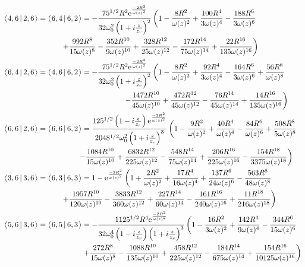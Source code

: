 \documentclass[11pt]{amsart}
\makeatletter
\newcommand{\e}{{\rm e}}				%
\newcommand{\msp}[1]{\mspace{#1mu}}		%
\newcommand{\0}{\varnothing}		%
\newcommand{\brac}[2]{\left\langle\msp{2} #1\left\lvert \msp{3.5} #2 \right.\right\rangle}	%
\newcommand{\1}{!}
\newcommand{\2}{@}
\newcommand{\3}{\#}
\newcommand{\4}{\$}
\newcommand{\5}{\%}
\newcommand{\6}{$^\wedge$}
\newcommand{\7}{\&}
\newcommand{\8}{*}
\newcommand{\9}{(}
\makeatother
\begin{document}
\begin{align*}
&\brac{4,6}{2,6} =\brac{6,4}{6,2} = -\frac{75^{1/2}R^2\e^{\frac{-2R^2}{\omega(z)^2}}}{32\omega_0^2\left(1+i\frac{z}{z_r}\right)^2}\left(1-\frac{8R^2}{\omega(z)^2}+\frac{100R^4}{3\omega(z)^4}-\frac{188R^6}{3\omega(z)^6}\right.
\\
&
\msp{140}\left.+\frac{992R^8}{15\omega(z)^8}-\frac{352R^{10}}{9\omega(z)^{10}}+\frac{328R^{12}}{25\omega(z)^{12}}-\frac{172R^{14}}{75\omega(z)^{14}}+\frac{22R^{16}}{135\omega(z)^{16}}\right)
\\
&
\brac{6,4}{2,6} = \brac{4,6}{6,2}=-\frac{75^{1/2}R^2\e^{\frac{-2R^2}{\omega(z)^2}}}{32\omega_0^2\left(1+i\frac{z}{z_r}\right)^2}\left(1-\frac{8R^2}{\omega(z)^2}+\frac{92R^4}{3\omega(z)^4}-\frac{164R^6}{3\omega(z)^6}+\frac{56R^8}{\omega(z)^8}\right.
\\
&
\msp{290}\left.-\frac{1472R^{10}}{45\omega(z)^{10}}+\frac{472R^{12}}{45\omega(z)^{12}}-\frac{76R^{14}}{45\omega(z)^{14}}+\frac{14R^{16}}{135\omega(z)^{16}}\right)
\\
&
\brac{6,6}{2,6} = \brac{6,6}{6,2} = \frac{125^{1/2}\left(1-i\frac{z}{z_r}\right)\e^{\frac{-2R^2}{\omega(z)^2}}}{2048^{1/2}\omega_0^2\left(1+i\frac{z}{z_r}\right)^3}\left(1-\frac{9R^2}{\omega(z)^2}+\frac{40R^4}{\omega(z)^4}-\frac{84R^6}{\omega(z)^6}+\frac{508R^8}{5\omega(z)^8}\right.
\\
&
\msp{180}\left.-\frac{1084R^{10}}{15\omega(z)^{10}}+\frac{6832R^{12}}{225\omega(z)^{12}}-\frac{548R^{14}}{75\omega(z)^{14}}+\frac{206R^{16}}{225\omega(z)^{16}}-\frac{154R^{18}}{3375\omega(z)^{18}}\right)
\\
&
\brac{3,6}{3,6} = \brac{6,3}{6,3} = 1-\e^{\frac{-2R^2}{\omega(z)^2}}\left(1+\frac{2R^2}{\omega(z)^2}+\frac{17R^4}{16\omega(z)^4}+\frac{137R^6}{24\omega(z)^6}-\frac{563R^8}{48\omega(z)^8}\right.
\\
&
\msp{140}\left.+\frac{1957R^{10}}{120\omega(z)^{10}}-\frac{3833R^{12}}{360\omega(z)^{12}}+\frac{227R^{14}}{60\omega(z)^{14}}-\frac{161R^{16}}{240\omega(z)^{16}}+\frac{11R^{18}}{216\omega(z)^{18}}\right)
\\
&
\brac{5,6}{3,6} = \brac{6,5}{6,3} = -\frac{1125^{1/2}R^4\e^{\frac{-2R^2}{\omega(z)^2}}}{32\omega_0^4\left(1-i\frac{z}{z_r}\right)\left(1+i\frac{z}{z_r}\right)^3}\left(1-\frac{16R^2}{3\omega(z)^2}+\frac{142R^4}{9\omega(z)^4}-\frac{344R^6}{15\omega(z)^6}\right.
\\
&
\left.
\msp{190}+\frac{272R^8}{15\omega(z)^8}-\frac{1088R^{10}}{135\omega(z)^{10}}+\frac{458R^{12}}{225\omega(z)^{12}}-\frac{184R^{14}}{675\omega(z)^{14}}+\frac{154R^{16}}{10125\omega(z)^{16}}\right)

\end{align*}
\end{document}
